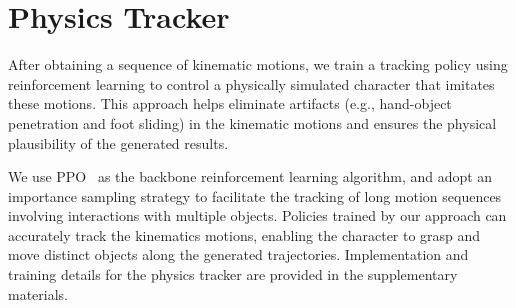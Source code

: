\section{Physics Tracker}
After obtaining a sequence of kinematic motions, we train a tracking policy using reinforcement learning to control a physically simulated character that imitates these motions. This approach helps eliminate artifacts (e.g., hand-object penetration and foot sliding) in the kinematic motions and ensures the physical plausibility of the generated results.

We use PPO~\cite{schulman2017proximal} as the backbone reinforcement learning algorithm,
and adopt an importance sampling strategy to facilitate the tracking of long motion sequences involving interactions with multiple objects.
Policies trained by our approach can accurately track the kinematics motions, enabling the character to grasp and move distinct objects along the generated trajectories.
Implementation and training details for the physics tracker are provided in the supplementary materials.